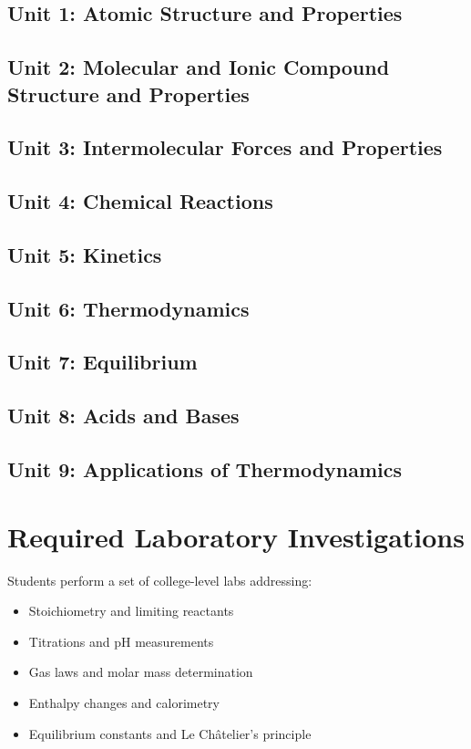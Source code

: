 \documentclass[12pt,oneside]{book}
\begin{document}
\subsection*{Unit 1: Atomic Structure and Properties}
\subsection*{Unit 2: Molecular and Ionic Compound Structure and Properties}
\subsection*{Unit 3: Intermolecular Forces and Properties}
\subsection*{Unit 4: Chemical Reactions}
\subsection*{Unit 5: Kinetics}
\subsection*{Unit 6: Thermodynamics}
\subsection*{Unit 7: Equilibrium}
\subsection*{Unit 8: Acids and Bases}
\subsection*{Unit 9: Applications of Thermodynamics}

\section{Required Laboratory Investigations}
Students perform a set of college-level labs addressing:
\begin{itemize}[leftmargin=2em]
    \item Stoichiometry and limiting reactants
    \item Titrations and pH measurements
    \item Gas laws and molar mass determination
    \item Enthalpy changes and calorimetry
    \item Equilibrium constants and Le Châtelier's principle
\end{itemize}
\end{document}
